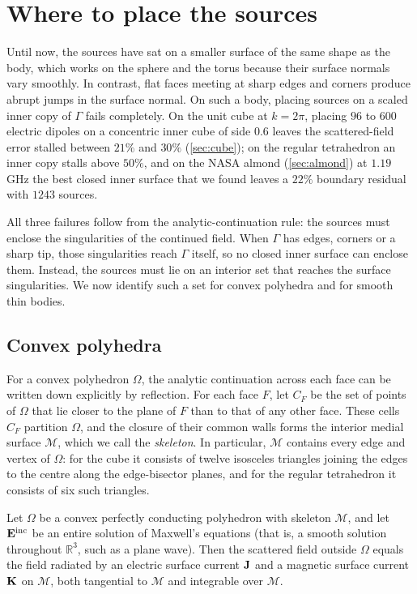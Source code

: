 \section{Where to place the sources}
\label{sec:skeleton}

Until now, the sources have sat on a smaller surface of the same shape as the body, which works on the sphere and the torus because their surface normals vary smoothly. In contrast, flat faces meeting at sharp edges and corners produce abrupt jumps in the surface normal. On such a body, placing sources on a scaled inner copy of $\Gamma$ fails completely. On the unit cube at $k = 2\pi$, placing $96$ to $600$ electric dipoles on a concentric inner cube of side $0.6$ leaves the scattered-field error stalled between $21\%$ and $30\%$ (\autoref{sec:cube}); on the regular tetrahedron an inner copy stalls above $50\%$, and on the NASA almond (\autoref{sec:almond}) at $1.19$\,GHz the best closed inner surface that we found leaves a $22\%$ boundary residual with $1243$ sources.

All three failures follow from the analytic-continuation rule: the sources must enclose the singularities of the continued field. When $\Gamma$ has edges, corners or a sharp tip, those singularities reach $\Gamma$ itself, so no closed inner surface can enclose them. Instead, the sources must lie on an interior set that reaches the surface singularities. We now identify such a set for convex polyhedra and for smooth thin bodies.

\subsection{Convex polyhedra}

For a convex polyhedron $\Omega$, the analytic continuation across each face can be written down explicitly by reflection. For each face $F$, let $C_F$ be the set of points of $\Omega$ that lie closer to the plane of $F$ than to that of any other face. These cells $C_F$ partition $\Omega$, and the closure of their common walls forms the interior medial surface $\mathcal{M}$, which we call the \emph{skeleton}. In particular, $\mathcal{M}$ contains every edge and vertex of $\Omega$: for the cube it consists of twelve isosceles triangles joining the edges to the centre along the edge-bisector planes, and for the regular tetrahedron it consists of six such triangles.

\begin{theorem}
\label{thm:skeleton}
Let $\Omega$ be a convex perfectly conducting polyhedron with skeleton $\mathcal{M}$, and let $\mathbf{E}^{\mathrm{inc}}$ be an entire solution of Maxwell's equations (that is, a smooth solution throughout $\mathbb{R}^3$, such as a plane wave). Then the scattered field outside $\Omega$ equals the field radiated by an electric surface current $\mathbf{J}$ and a magnetic surface current $\mathbf{K}$ on $\mathcal{M}$, both tangential to $\mathcal{M}$ and integrable over $\mathcal{M}$.
\end{theorem}

